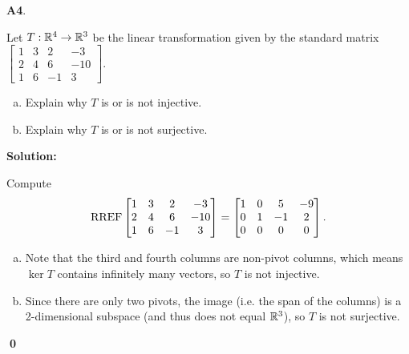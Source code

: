 \documentclass{article}
\newenvironment{problem}[1]
{
  \begin{flushleft}
  \textbf{#1}.
  \ignorespaces
}
{
  \end{flushleft}
}
\newenvironment{solution}
{
  \ignorespaces
  \textbf{Solution:}
}
{
  \ignorespacesafterend
  \begin{flushright}
  {\bfseries \qed}
  \end{flushright}
}
\begin{document}
\begin{problem}{A4}
Let \(T: \mathbb{R}^4 \rightarrow \mathbb{R}^3\) be the linear transformation given by the standard matrix \(\begin{bmatrix} 1 & 3 & 2 & -3 \\ 2 & 4 & 6 & -10 \\ 1 & 6 & -1 & 3 \end{bmatrix}\).
\begin{enumerate}[(a)]
\item Explain why \(T\) is or is not injective.
\item Explain why \(T\) is or is not surjective.
\end{enumerate}
\end{problem}
\begin{solution}
Compute \[\operatorname{RREF}\begin{bmatrix}1 & 3 & 2 & -3 \\ 2 & 4 & 6 & -10 \\ 1 & 6 & -1 & 3 \end{bmatrix} = \begin{bmatrix} 1 & 0 & 5 & -9 \\ 0 & 1 & -1 & 2 \\ 0 & 0 & 0 & 0\end{bmatrix}.\]
\begin{enumerate}[(a)]
\item Note that the third and fourth columns are non-pivot columns, which means \(\ker T\) contains infinitely many vectors, so \(T\) is not injective.
\item Since there are only two pivots, the image (i.e. the span of the columns) is a 2-dimensional subspace (and thus does not equal \(\mathbb{R}^3\)), so \(T\) is not surjective.
\end{enumerate}
\end{solution}
\end{document}
